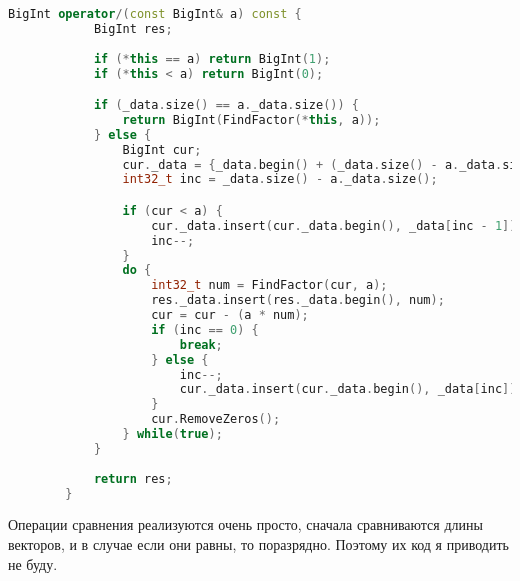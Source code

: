 \begin{lstlisting}[language=c++]
BigInt operator/(const BigInt& a) const {
            BigInt res;
            
            if (*this == a) return BigInt(1);
            if (*this < a) return BigInt(0);

            if (_data.size() == a._data.size()) {
                return BigInt(FindFactor(*this, a));
            } else {
                BigInt cur;
                cur._data = {_data.begin() + (_data.size() - a._data.size()), _data.end()};
                int32_t inc = _data.size() - a._data.size();

                if (cur < a) {
                    cur._data.insert(cur._data.begin(), _data[inc - 1]);
                    inc--;
                }
                do {
                    int32_t num = FindFactor(cur, a);
                    res._data.insert(res._data.begin(), num);
                    cur = cur - (a * num);
                    if (inc == 0) {
                        break;
                    } else {
                        inc--;
                        cur._data.insert(cur._data.begin(), _data[inc]);
                    }
                    cur.RemoveZeros();
                } while(true);
            }
            
            return res;
        }
\end{lstlisting}

Операции сравнения реализуются очень просто, сначала сравниваются длины векторов, и в случае если они равны, то поразрядно. Поэтому их код я приводить не буду.

\pagebreak
